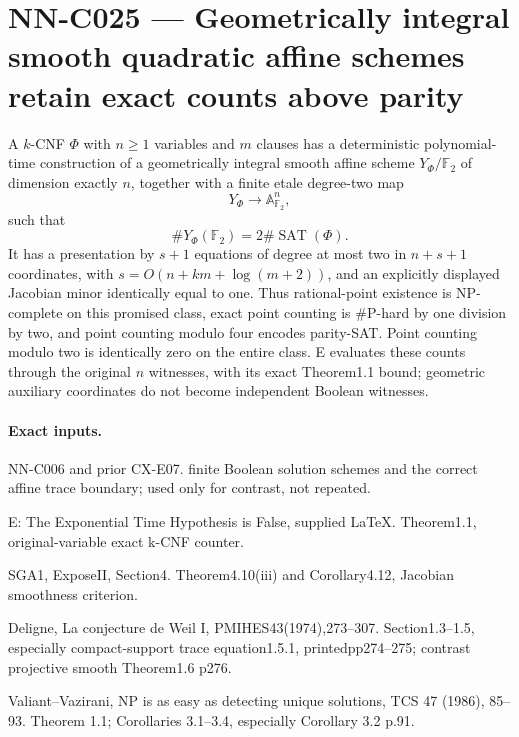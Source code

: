 \section{NN-C025 --- Geometrically integral smooth quadratic affine schemes retain exact counts above parity}
\begin{proposition}[NN-C025]
A $k$-CNF $\Phi$ with $n\geq1$ variables and $m$ clauses has a deterministic polynomial-time construction of a geometrically integral smooth affine scheme $Y_\Phi/\mathbb F_2$ of dimension exactly $n$, together with a finite etale degree-two map
\[
             Y_\Phi\longrightarrow\mathbb A^n_{\mathbb F_2},
\]
such that
\[
        \#Y_\Phi(\mathbb F_2)=2\#\operatorname{SAT}(\Phi).
\]
It has a presentation by $s+1$ equations of degree at most two in $n+s+1$ coordinates, with $s=O(n+km+\log(m+2))$, and an explicitly displayed Jacobian minor identically equal to one. Thus rational-point existence is NP-complete on this promised class, exact point counting is $\#\mathrm P$-hard by one division by two, and point counting modulo four encodes parity-SAT. Point counting modulo two is identically zero on the entire class. E evaluates these counts through the original $n$ witnesses, with its exact Theorem1.1 bound; geometric auxiliary coordinates do not become independent Boolean witnesses.
\end{proposition}
\paragraph{Exact inputs.}
NN-C006 and prior CX-E07. finite Boolean solution schemes and the correct affine trace boundary; used only for contrast, not repeated.

E: The Exponential Time Hypothesis is False, supplied LaTeX. Theorem1.1, original-variable exact k-CNF counter.

SGA1, ExposeII, Section4. Theorem4.10(iii) and Corollary4.12, Jacobian smoothness criterion.

Deligne, La conjecture de Weil I, PMIHES43(1974),273--307. Section1.3--1.5, especially compact-support trace equation1.5.1, printedpp274--275; contrast projective smooth Theorem1.6 p276.

Valiant--Vazirani, NP is as easy as detecting unique solutions, TCS 47 (1986), 85--93. Theorem 1.1; Corollaries 3.1--3.4, especially Corollary 3.2 p.91.

